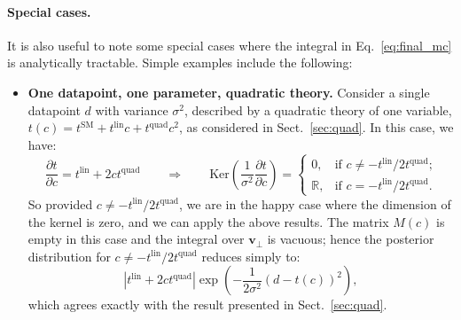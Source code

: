 \documentclass[withindex,glossary]{cam-thesis}
\renewcommand{\vec}[1]{\textbf{#1}} %
\begin{document}
\paragraph{Special cases.} It is also useful to note some special cases where the integral in Eq.~\eqref{eq:final_mc} is analytically tractable. Simple examples include the following:
\begin{itemize}
\item \textbf{One datapoint, one parameter, quadratic theory.} Consider a single datapoint $d$ with variance $\sigma^2$, described by a quadratic theory of one variable, $t(c) = t^{\text{SM}} + t^{\text{lin}}c + t^{\text{quad}}c^2$, as considered in Sect.~\ref{sec:quad}. In this case, we have:
\begin{equation}
\frac{\partial t}{\partial c} = t^{\text{lin}} + 2c t^{\text{quad}} \qquad \Rightarrow \qquad \textrm{Ker}\left(\frac{1}{\sigma^2}\frac{\partial t}{\partial c} \right) = \begin{cases} 0, & \text{if $c \neq -t^{\text{lin}}/2t^{\text{quad}}$;} \\ \mathbb{R}, & \text{if $c = -t^{\text{lin}} /2 t^{\text{quad}}$.} \end{cases}
\end{equation}
So provided $c \neq -t^{\text{lin}} / 2 t^{\text{quad}}$, we are in the happy case where the dimension of the kernel is zero, and we can apply the above results. The matrix $M(c)$ is empty in this case and the integral over $\vec{v}_{\perp}$ is vacuous; hence the posterior distribution for $c \neq -t^{\text{lin}} / 2t^{\text{quad}}$ reduces simply to:
\begin{equation}
\left| t^{\text{lin}} + 2c t^{\text{quad}} \right| \exp\left( -\frac{1}{2\sigma^2} (d - t(c))^2\right),
\end{equation}
which agrees exactly with the result presented in Sect.~\ref{sec:quad}.


\end{itemize}
\end{document}
